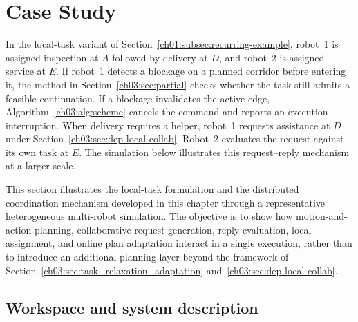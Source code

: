 \section{Case Study}
\label{sec:ch03_case_study}

\begin{revision}
In the local-task variant of Section~\ref{ch01:subsec:recurring-example},
robot~1 is assigned inspection at $A$ followed by delivery at $D$, and
robot~2 is assigned service at $E$. If robot~1 detects a blockage on a
planned corridor before entering it, the method in
Section~\ref{ch03:sec:partial} checks whether the task
still admits a feasible continuation. If a blockage invalidates the active
edge, Algorithm~\ref{ch03:alg:scheme} cancels the command and reports an
execution interruption. When
delivery requires a helper, robot~1 requests assistance at $D$ under
Section~\ref{ch03:sec:dep-local-collab}. Robot~2 evaluates the request
against its own task at $E$. The simulation below illustrates this
request--reply mechanism at a larger scale.
\end{revision}

This section illustrates the local-task formulation and the distributed
coordination mechanism developed in this chapter through a representative
heterogeneous multi-robot simulation. The objective is to show how
motion-and-action planning, collaborative request generation, reply evaluation,
local assignment, and online plan adaptation interact in a single execution,
rather than to introduce an additional planning layer beyond the framework of
Section~\ref{ch03:sec:task_relaxation_adaptation}
and~\ref{ch03:sec:dep-local-collab}.

\subsection{Workspace and system description}
\label{ch03:subsec:case_workspace}

